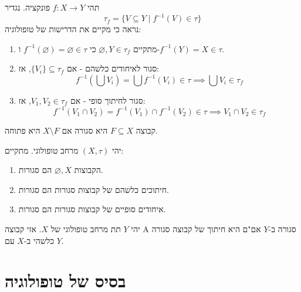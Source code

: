 \documentclass{tstextbook}
\begin{document}
\begin{example}
תהי \(f:X\to Y\) פונקציה. נגדיר
$$ \tau_f = \{ V \subseteq Y \mid f^{-1}(V) \in \tau \} $$
נראה כי מקיים את הדרישות של טופולוגיה:

  \begin{enumerate}
    \item מתקיים \(\varnothing, Y \in \tau_f\) כי \(f^{-1}(\varnothing)=\varnothing \in \tau\) ו-\(f^{-1}(Y)=X \in \tau\). 


    \item סגור לאיחודים כלשהם - אם \(\{V_i\} \subseteq \tau_f\), אז: 
$$f^{-1}(\bigcup V_i) = \bigcup f^{-1}(V_i) \in \tau \implies \bigcup V_i \in \tau_f$$


    \item סגור לחיתוך סופי - אם \(V_1, V_2 \in \tau_f\), אז: 
$$f^{-1}(V_1 \cap V_2) = f^{-1}(V_1) \cap f^{-1}(V_2) \in \tau \implies V_1 \cap V_2 \in \tau_f$$


  \end{enumerate}
\end{example}
\begin{definition}
קבוצה \(F\subseteq X\) היא סגורה אם \(X\setminus F\) היא פתוחה.

\end{definition}
\begin{proposition}
יהי \((X,\tau)\) מרחב טופולוגי. מתקיים:

  \begin{enumerate}
    \item הקבוצות \(\varnothing,X\) הם סגורות. 


    \item חיתוכים כלשהם של קבוצות סגורות הם סגורות. 


    \item איחודים סופיים של קבוצות סגורות הם סגורות. 


  \end{enumerate}
\end{proposition}
\begin{proposition}
יהי \(Y\) תת מרחב טופולוגי של \(X\). אזי קבוצה A סגורה ב-\(Y\) אם"ם היא חיתוך של קבוצה סגורה כלשהי ב-\(X\) עם \(Y\).

\end{proposition}
\section{בסיס של טופולוגיה}
\end{document}
